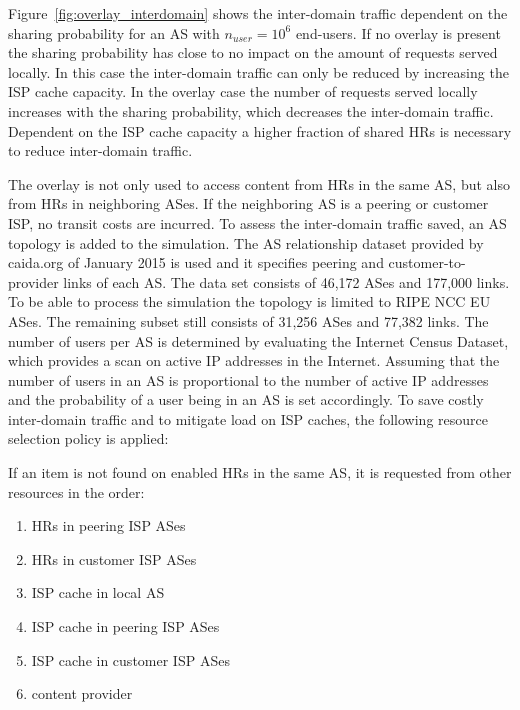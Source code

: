 
Figure~\ref{fig:overlay_interdomain} shows the inter-domain traffic dependent on the sharing probability for an AS with $n_{user}=10^6$ end-users. If no overlay is present the sharing probability has close to no impact on the amount of requests served locally. In this case the inter-domain traffic can only be reduced by increasing the ISP cache capacity. In the overlay case the number of requests served locally increases with the sharing probability, which decreases the inter-domain traffic. Dependent on the ISP cache capacity a higher fraction of shared HRs is necessary to reduce inter-domain traffic.


The overlay is not only used to access content from HRs in the same AS, but also from HRs in neighboring ASes. If the neighboring AS is a peering or customer ISP, no transit costs are incurred.
To assess the inter-domain traffic saved, an AS topology is added to the simulation. The AS relationship dataset provided by caida.org\cite{caida2015} of January 2015 is used and it specifies peering and customer-to-provider links of each AS. The data set consists of 46,172 ASes and 177,000 links.
To be able to process the simulation the topology is limited to RIPE NCC EU ASes. The remaining subset still consists of 31,256 ASes and 77,382 links.
The number of users per AS is determined by evaluating the Internet Census Dataset\cite{carna2013}, which provides a scan on active IP addresses in the Internet. Assuming that the number of users in an AS is proportional to the number of active IP addresses and the probability of a user being in an AS is set accordingly.
To save costly inter-domain traffic and to mitigate load on ISP caches, the following resource selection policy is applied:

If an item is not found on enabled HRs in the same AS, it is requested from other resources in the order:
\begin{enumerate}
	\itemsep0em
	\item HRs in peering ISP ASes
	\item HRs in customer ISP ASes
	\item ISP cache in local AS
	\item ISP cache in peering ISP ASes
	\item ISP cache in customer ISP ASes
	\item content provider
\end{enumerate}

